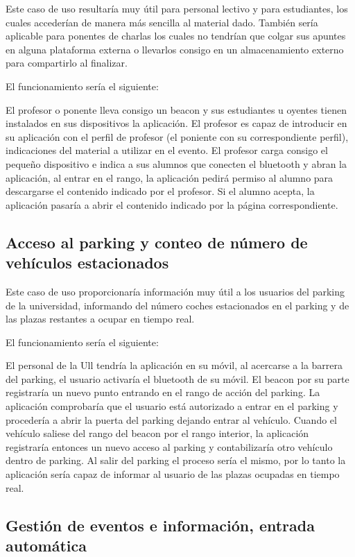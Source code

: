 Este caso de uso resultaría muy útil para personal lectivo y para estudiantes, los cuales accederían de manera más sencilla al material dado. También sería aplicable para ponentes de charlas los cuales no tendrían que colgar sus apuntes en alguna plataforma externa o llevarlos consigo en  un almacenamiento externo para compartirlo al finalizar.

El funcionamiento sería el siguiente: 

El profesor o ponente lleva consigo un beacon y sus estudiantes u oyentes tienen instalados en sus dispositivos la aplicación. El profesor es capaz de introducir en su aplicación con el perfil de profesor (el poniente con su correspondiente perfil), indicaciones del material a utilizar en el evento. El profesor carga consigo el pequeño dispositivo e indica a sus alumnos que conecten el bluetooth y abran la aplicación, al entrar en el rango, la aplicación pedirá permiso al alumno para descargarse el contenido indicado por el profesor. Si el alumno acepta, la aplicación pasaría a abrir  el contenido indicado por la página correspondiente.


\subsection{Acceso al parking y conteo de número de vehículos estacionados}


Este caso de uso proporcionaría información muy útil a los usuarios del parking de la universidad, informando del número coches estacionados en el parking y de las plazas restantes a ocupar en tiempo real.

El funcionamiento sería el siguiente: 

El personal de la Ull tendría la aplicación en su móvil, al acercarse a la barrera del parking, el usuario activaría el bluetooth de su móvil. El beacon por su parte registraría un nuevo punto entrando en el rango de acción del parking. La aplicación comprobaría que el usuario está autorizado a entrar en el parking y procedería a abrir la puerta del parking dejando entrar al vehículo. Cuando el vehículo saliese del rango del beacon por el rango interior, la aplicación registraría entonces un nuevo acceso al parking y contabilizaría otro vehículo dentro de parking. Al salir del parking el proceso sería el mismo, por lo tanto la aplicación sería capaz de informar al usuario de las plazas ocupadas en tiempo real.


\subsection{Gestión de eventos e información, entrada automática}

